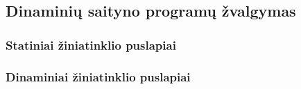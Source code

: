 \subsection{Dinaminių saityno programų žvalgymas}
\subsubsection{Statiniai žiniatinklio puslapiai}
\subsubsection{Dinaminiai žiniatinklio puslapiai}